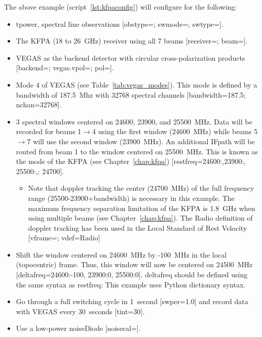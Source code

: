 \vspace{-0.1cm}
\noindent The above example (script~\ref{lst:kfpaconfig}) will configure for the
following:
\vspace{-0.1cm}
\begin{itemize}
\item \Gls{tpower}, spectral line observations [obstype=;
swmode=; swtype=].
\item The \gls{KFPA} (18 to 26~GHz) receiver using all 7 beams
[receiver=; beam=].
\item \gls{VEGAS} as the backend detector with circular cross-polarization products
[backend=; vegas.vpol=; pol=].
\item {Mode 4 of \gls{VEGAS} (see Table~\ref{tab:vegas_modes}).  This mode is defined by
a bandwidth of 187.5~Mhz with 32768 spectral channels [bandwidth=187.5; nchan=32768].}
\item {3 spectral windows centered on 24600, 23900, and 25500~MHz.  Data will be recorded
for beams 1$\rightarrow$4 using the first window (24600~MHz) while beams 5$\rightarrow$7
will use the second window (23900~MHz).  An additional \gls{IFpath} will be routed
from beam 1 to the window centered on 25500~MHz.  This is known as the  mode of the
\gls{KFPA} (see Chapter~\ref{chap:kfpa}) [restfreq={24600:,23900:,
25500:,: 24700}].}
\begin{itemize}
\item {Note that doppler tracking the center (24700~MHz) of the full frequency range
(25500-23900+bandwidth) is necessary in this example.  The maximum frequency separation
limitation of the \gls{KFPA} is 1.8~GHz when using multiple beams
(see Chapter~\ref{chap:kfpa}).  The Radio definition of doppler tracking has been used
in the Local Standard of Rest Velocity [vframe=; vdef=Radio]}
\end{itemize}
\item Shift the window centered on 24600~MHz by -100~MHz in the local (topocentric)
frame.  Thus, this window will now be centered on 24500~MHz
[deltafreq={24600:-100, 23900:0, 25500:0}].  deltafreq should be defined using the same
syntax as restfreq: This example uses Python dictionary syntax.
\item Go through a full switching cycle in 1~second [swper=1.0] and record data with
\gls{VEGAS} every 30~seconds [tint=30].
\item Use a low-power \gls{noiseDiode} [noisecal=].
\end{itemize}
\newpage

